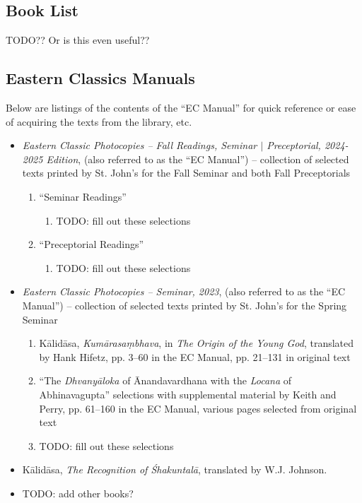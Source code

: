 \documentclass{article}
\begin{document}
\clearpage

\begin{center}
	\section{Book List}
\end{center}

TODO?? Or is this even useful??

\subsection{Eastern Classics Manuals}
Below are listings of the contents of the ``EC Manual'' for quick reference or ease of acquiring the texts from the library, etc.

\begin{itemize}
	\item \textit{Eastern Classic Photocopies -- Fall Readings, Seminar $|$ Preceptorial, 2024-2025 Edition}, (also referred to as the ``EC Manual'') -- collection of selected texts printed by St. John's for the Fall Seminar and both Fall Preceptorials
	      \begin{enumerate}
		      \item ``Seminar Readings''
		            \begin{enumerate}
			            \item TODO: fill out these selections
		            \end{enumerate}
		      \item ``Preceptorial Readings''
		            \begin{enumerate}
			            \item TODO: fill out these selections
		            \end{enumerate}
	      \end{enumerate}
	\item \textit{Eastern Classic Photocopies -- Seminar, 2023}, (also referred to as the ``EC Manual'') -- collection of selected texts printed by St. John's for the Spring Seminar
	      \begin{enumerate}
		      \item Kālidāsa, \emph{Kumārasaṃbhava}, in \emph{The Origin of the Young God}, translated by Hank Hifetz, pp. 3--60 in the EC Manual, pp. 21--131 in original text
		      \item ``The \emph{Dhvanyāloka} of Ānandavardhana with the \emph{Locana} of Abhinavagupta'' selections with supplemental material by Keith and Perry, pp. 61--160 in the EC Manual, various pages selected from original text
		      \item TODO: fill out these selections
	      \end{enumerate}
	\item Kālidāsa, \emph{The Recognition of Śhakuntalā}, translated by W.J. Johnson.
	\item TODO: add other books?
\end{itemize}
\end{document}
